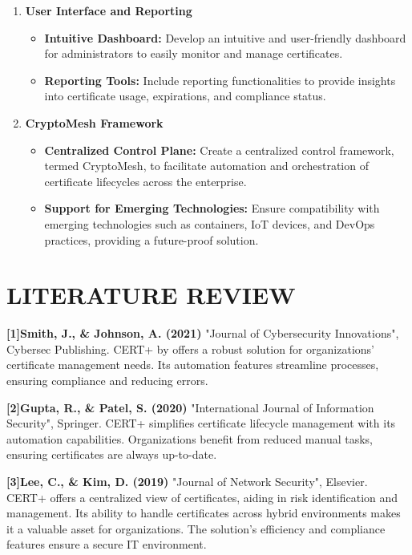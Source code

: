 \documentclass[10pt]{report}
\begin{document}
\begin{enumerate}[{label=\arabic*.]
    \item \textbf{User Interface and Reporting}
    \begin{itemize}
        \item \textbf{Intuitive Dashboard:} Develop an intuitive and user-friendly dashboard for administrators to easily monitor and manage certificates.
        \item \textbf{Reporting Tools:} Include reporting functionalities to provide insights into certificate usage, expirations, and compliance status.
    \end{itemize}
    
    \item \textbf{CryptoMesh Framework}
    \begin{itemize}
        \item \textbf{Centralized Control Plane:} Create a centralized control framework, termed CryptoMesh, to facilitate automation and orchestration of certificate lifecycles across the enterprise.
        \item \textbf{Support for Emerging Technologies:} Ensure compatibility with emerging technologies such as containers, IoT devices, and DevOps practices, providing a future-proof solution.
    \end{itemize}
    
\end{enumerate}

\chapter{LITERATURE REVIEW}
\textbf{ [1]Smith, J., & Johnson, A. (2021)} "Journal of Cybersecurity Innovations", Cybersec Publishing. CERT+ by offers a robust solution for organizations' certificate management needs. Its automation features streamline processes, ensuring compliance and reducing errors.

\textbf{[2]Gupta, R., & Patel, S. (2020)} "International Journal of Information Security", Springer. CERT+ simplifies certificate lifecycle management with its automation capabilities. Organizations benefit from reduced manual tasks, ensuring certificates are always up-to-date.

\textbf{[3]Lee, C., & Kim, D. (2019)} "Journal of Network Security", Elsevier. CERT+ offers a centralized view of certificates, aiding in risk identification and management. Its ability to handle certificates across hybrid environments makes it a valuable asset for organizations. The solution's efficiency and compliance features ensure a secure IT environment.
\end{document}
